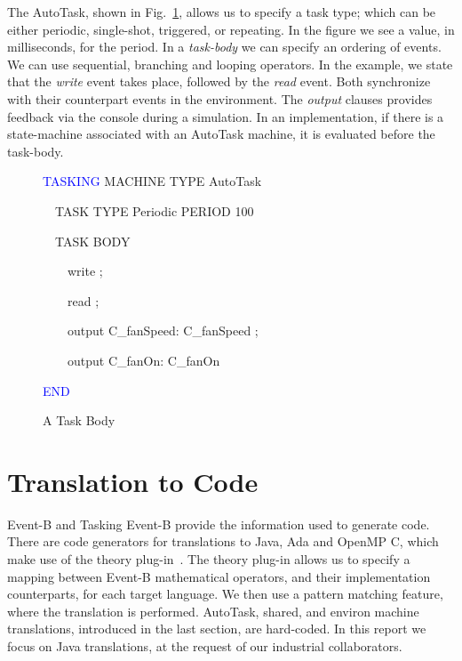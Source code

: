 \documentclass{llncs}%
\begin{document}
The AutoTask, shown in Fig.~\ref{fig:TaskBody}, allows us to specify a task type; which can be either periodic, single-shot, triggered, or repeating. In the figure we see a value, in milliseconds, for the period. In a \emph{task-body} we can specify an ordering of events. We can use sequential, branching and looping operators. In the example, we state that the \emph{write} event takes place, followed by the \emph{read} event. Both synchronize with their counterpart events in the environment. The \emph{output} clauses provides feedback via the console during a simulation. In an implementation, if there is a state-machine associated with an AutoTask machine, it is evaluated before the task-body.
%
\begin{figure}
\centering
\begin{minipage}{0.5\textwidth}
\textcolor{blue}{TASKING} MACHINE TYPE AutoTask \ 

\ \ TASK TYPE Periodic PERIOD 100 \ 

\ \ TASK BODY

\ \ \ \ write ;

\ \ \ \ read ;

\ \ \ \ output C\_fanSpeed: C\_fanSpeed ;

\ \ \ \ output C\_fanOn: C\_fanOn 

\textcolor{blue}{END}
\end{minipage}
\caption{A Task Body}
\label{fig:TaskBody}
\end{figure}
%
%
%
%
%
\section{ Translation to Code}\label{translat}
Event-B and Tasking Event-B provide the information used to generate code. There are code generators for translations to Java, Ada and OpenMP C, which make use of the theory plug-in~\cite{ecs18269}. The theory plug-in allows us to specify a mapping between Event-B mathematical operators, and their implementation counterparts, for each target language. We then use a pattern matching feature, where the translation is performed. AutoTask, shared, and environ machine translations, introduced in the last section, are hard-coded. In this report we focus on Java translations, at the request of our industrial collaborators. 
\end{document}
